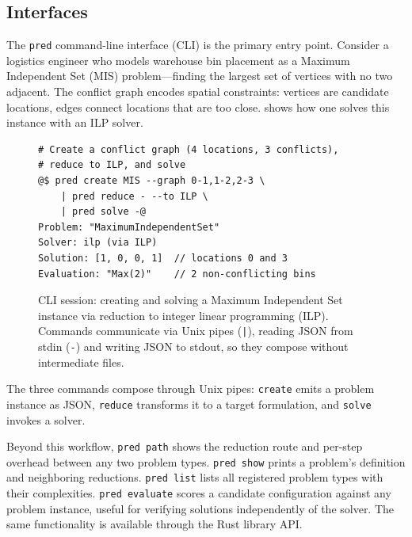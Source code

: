 \documentclass[conference]{IEEEtran}
\begin{document}
\subsection{Interfaces}\label{sec:user-interfaces}

The \texttt{pred} command-line interface (CLI) is the primary entry point.
Consider a logistics engineer who models warehouse bin placement as a Maximum Independent Set (MIS) problem---finding the largest set of vertices with no two adjacent.
The conflict graph encodes spatial constraints: vertices are candidate locations, edges connect locations that are too close.
 shows how one solves this instance with an ILP solver.
\begin{figure}[t]
\begin{lstlisting}
# Create a conflict graph (4 locations, 3 conflicts),
# reduce to ILP, and solve
@$ pred create MIS --graph 0-1,1-2,2-3 \
    | pred reduce - --to ILP \
    | pred solve -@
Problem: "MaximumIndependentSet"
Solver: ilp (via ILP)
Solution: [1, 0, 0, 1]  // locations 0 and 3
Evaluation: "Max(2)"    // 2 non-conflicting bins
\end{lstlisting}
\caption{CLI session: creating and solving a Maximum Independent Set instance via reduction to integer linear programming (ILP).
  Commands communicate via Unix pipes (\texttt{|}), reading JSON from stdin (\texttt{-}) and writing JSON to stdout, so they compose without intermediate files.}
\label{lst:cli-session}
\end{figure}
The three commands compose through Unix pipes: \texttt{create} emits a problem instance as JSON, \texttt{reduce} transforms it to a target formulation, and \texttt{solve} invokes a solver.

Beyond this workflow, \texttt{pred path} shows the reduction route and per-step overhead between any two problem types.
\texttt{pred show} prints a problem's definition and neighboring reductions.
\texttt{pred list} lists all registered problem types with their complexities.
\texttt{pred evaluate} scores a candidate configuration against any problem instance, useful for verifying solutions independently of the solver.
The same functionality is available through the Rust library API.
\end{document}

